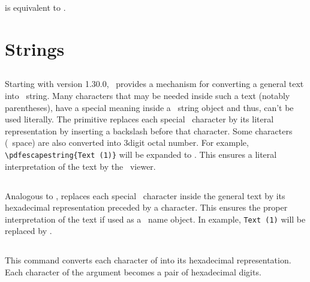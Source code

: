 \documentclass{pdftexmanual}
\begin{document}
 is equivalent to .

\section{Strings}

\subsection{}

Starting with version 1.30.0, \PDFTEX\ provides a mechanism for
converting a general text into \PDF\ string. Many characters that may be
needed inside such a text (notably parentheses), have a special meaning
inside a \PDF\ string object and thus, can't be used literally. The
primitive replaces each special \PDF\ character by its literal
representation by inserting a backslash before that character. Some
characters (\eg\ space) are also converted into 3\hyph digit octal
number. For example, \verb|\pdfescapestring{Text (1)}| will be expanded
to . This ensures a literal interpretation of the
text by the \PDF\ viewer. 

\subsection{}

Analogous to ,  replaces each
special \PDF\ character inside the general text by its hexadecimal
representation preceded by a \type{#} character. This ensures the proper
interpretation of the text if used as a \PDF\ name object. In example,
\verb|Text (1)| will be replaced by .

\subsection{}

This command converts each character of  into its
hexadecimal representation. Each character of the argument becomes a pair of
hexadecimal digits. 
\end{document}
